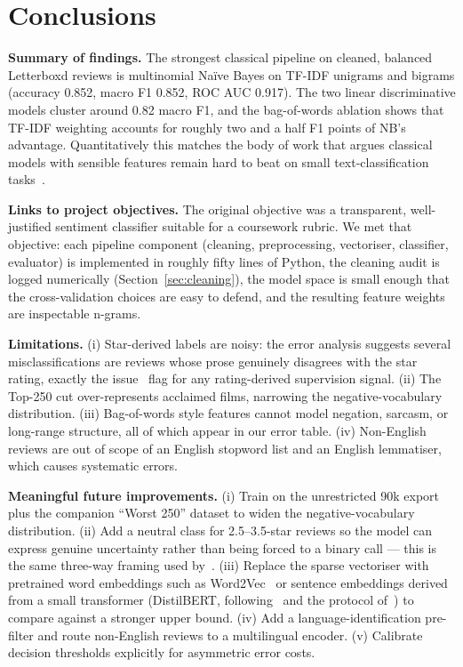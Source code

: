 \documentclass[11pt]{article}
\begin{document}
\section{Conclusions}
\label{sec:conclude}

\textbf{Summary of findings.} The strongest classical pipeline on cleaned, balanced Letterboxd reviews is multinomial Na\"ive Bayes on TF-IDF unigrams and bigrams (accuracy 0.852, macro F1 0.852, ROC AUC 0.917). The two linear discriminative models cluster around 0.82 macro F1, and the bag-of-words ablation shows that TF-IDF weighting accounts for roughly two and a half F1 points of NB's advantage. Quantitatively this matches the body of work that argues classical models with sensible features remain hard to beat on small text-classification tasks~\citep{joachims_1998, mccallum_nigam_1998, wang_manning_2012}.

\textbf{Links to project objectives.} The original objective was a transparent, well-justified sentiment classifier suitable for a coursework rubric. We met that objective: each pipeline component (cleaning, preprocessing, vectoriser, classifier, evaluator) is implemented in roughly fifty lines of Python, the cleaning audit is logged numerically (Section~\ref{sec:cleaning}), the model space is small enough that the cross-validation choices are easy to defend, and the resulting feature weights are inspectable n-grams.

\textbf{Limitations.} (i) Star-derived labels are noisy: the error analysis suggests several misclassifications are reviews whose prose genuinely disagrees with the star rating, exactly the issue~\citet{pang_lee_vaithyanathan_2002} flag for any rating-derived supervision signal. (ii) The Top-250 cut over-represents acclaimed films, narrowing the negative-vocabulary distribution. (iii) Bag-of-words style features cannot model negation, sarcasm, or long-range structure, all of which appear in our error table. (iv) Non-English reviews are out of scope of an English stopword list and an English lemmatiser, which causes systematic errors.

\textbf{Meaningful future improvements.} (i) Train on the unrestricted 90k export plus the companion ``Worst 250'' dataset to widen the negative-vocabulary distribution. (ii) Add a neutral class for 2.5--3.5-star reviews so the model can express genuine uncertainty rather than being forced to a binary call --- this is the same three-way framing used by~\citet{pang_lee_vaithyanathan_2002}. (iii) Replace the sparse vectoriser with pretrained word embeddings such as Word2Vec~\citep{mikolov_2013} or sentence embeddings derived from a small transformer (DistilBERT, following~\citet{devlin_bert_2019} and the protocol of~\citet{maas_imdb_2011}) to compare against a stronger upper bound. (iv) Add a language-identification pre-filter and route non-English reviews to a multilingual encoder. (v) Calibrate decision thresholds explicitly for asymmetric error costs.
\end{document}
